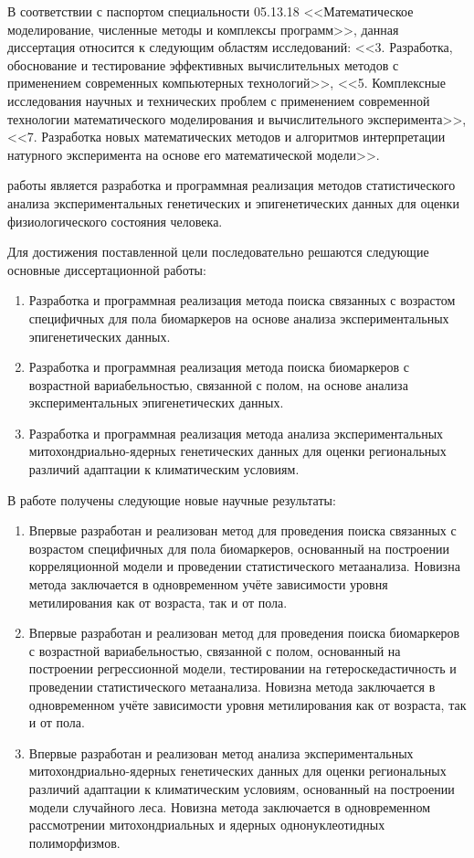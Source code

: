 В соответствии с паспортом специальности 05.13.18 <<Математическое моделирование, численные методы и комплексы программ>>, данная диссертация относится к следующим областям исследований: <<3. Разработка, обоснование и тестирование эффективных вычислительных методов с применением современных компьютерных технологий>>, <<5. Комплексные исследования научных и технических проблем с применением современной технологии математического моделирования и вычислительного эксперимента>>, <<7. Разработка новых математических методов и алгоритмов интерпретации натурного эксперимента на основе его математической модели>>.

{\aim} работы является разработка и программная реализация методов статистического анализа экспериментальных генетических и эпигенетических данных для оценки физиологического состояния человека.

Для достижения поставленной цели последовательно решаются следующие основные {\tasks} диссертационной работы:
\begin{enumerate}[beginpenalty=10000]
	\item Разработка и программная реализация метода поиска связанных с возрастом специфичных для пола биомаркеров на основе анализа экспериментальных эпигенетических данных.
	\item Разработка и программная реализация метода поиска биомаркеров с возрастной вариабельностью, связанной с полом, на основе анализа экспериментальных эпигенетических данных. 
	\item Разработка и программная реализация метода анализа экспериментальных митохондриально-ядерных генетических данных для оценки региональных различий адаптации к климатическим условиям. 
\end{enumerate}

{\novelty} В работе получены следующие новые научные результаты:
\begin{enumerate}[beginpenalty=10000] 
	\item Впервые разработан и реализован метод для проведения поиска связанных с возрастом специфичных для пола биомаркеров, основанный на построении корреляционной модели и проведении статистического метаанализа. Новизна метода заключается в одновременном учёте зависимости уровня метилирования как от возраста, так и от пола.
	\item Впервые разработан и реализован метод для проведения поиска биомаркеров с возрастной вариабельностью, связанной с полом, основанный на построении регрессионной модели, тестировании на гетероскедастичность и проведении статистического метаанализа. Новизна метода заключается в одновременном учёте зависимости уровня метилирования как от возраста, так и от пола. 
	\item Впервые разработан и реализован метод анализа экспериментальных митохондриально-ядерных генетических данных для оценки региональных различий адаптации к климатическим условиям, основанный на построении модели случайного леса. Новизна метода заключается в одновременном рассмотрении митохондриальных и ядерных однонуклеотидных полиморфизмов.
\end{enumerate}

